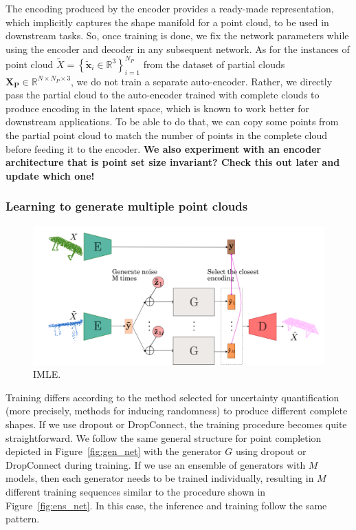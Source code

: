         The encoding produced by the encoder provides a ready-made representation, which implicitly captures the shape manifold for a point cloud, to be used in downstream tasks. So, once training is done, we fix the network parameters while using the encoder and decoder in any subsequent network. As for the instances of point cloud $\tilde{X}=\left\{\mathbf{\tilde{x}}_{i} \in \mathbb{R}^{3}\right\}_{i=1}^{N_P}$ from the dataset of partial clouds $\mathbf{X_P} \in \mathbb{R}^{N \times N_P \times 3}$, we do not train a separate auto-encoder. Rather, we directly pass the partial cloud to the auto-encoder trained with complete clouds to produce encoding in the latent space, which is known to work better for downstream applications. To be able to do that, we can copy some points from the partial point cloud to match the number of points in the complete cloud before feeding it to the encoder. \textbf{\color{orange}We also experiment with an encoder architecture that is point set size invariant? Check this out later and update which one!}


        \subsubsection{Learning to generate multiple point clouds}
        \begin{figure}[htb]
          \begin{center}
          \includegraphics[width=\linewidth]{figures/implicit_gen_network_imle.png}
          \end{center}
          \caption{IMLE.}\label{fig:imle}
        \end{figure}
        Training differs according to the method selected for uncertainty quantification (more precisely, methods for inducing randomness) to produce different complete shapes. If we use dropout or DropConnect, the training procedure becomes quite straightforward. We follow the same general structure for point completion depicted in Figure~\ref{fig:gen_net} with the generator $G$ using dropout or DropConnect during training. If we use an ensemble of generators with $M$ models, then each generator needs to be trained individually, resulting in $M$ different training sequences similar to the procedure shown in Figure~\ref{fig:ens_net}. In this case, the inference and training follow the same pattern. 
        
